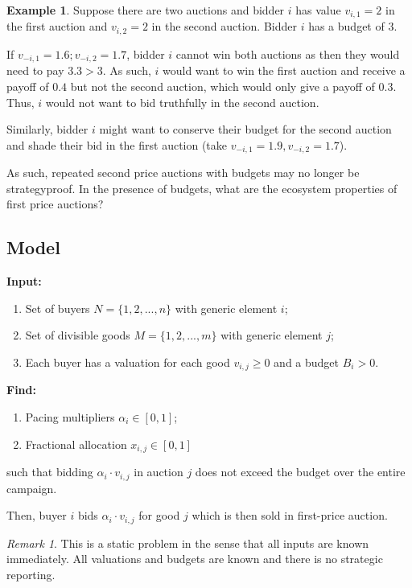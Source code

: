 \documentclass[dvipsnames]{article}
\theoremstyle{definition}
\newtheorem{example}[definition]{Example}
\theoremstyle{remark}
\newtheorem*{remark}{Remark}
\begin{document}
\begin{example}
	Suppose there are two auctions and bidder $i$ has value $v_{i,1} = 2$ in the first auction and $v_{i,2} = 2$ in the second auction. Bidder $i$ has a budget of $3$.
	
	If $v_{-i,1} = 1.6; v_{-i,2} = 1.7$, bidder $i$ cannot win both auctions as then they would need to pay $3.3>3$. As such, $i$ would want to win the first auction and receive a payoff of $0.4$ but not the second auction, which would only give a payoff of $0.3$. Thus, $i$ would not want to bid truthfully in the second auction. 
	
	Similarly, bidder $i$ might want to conserve their budget for the second auction and shade their bid in the first auction (take $v_{-i,1} = 1.9, v_{-i,2} = 1.7$).
\end{example}

As such, repeated second price auctions with budgets may no longer be strategyproof. In the presence of budgets, what are the ecosystem properties of first price auctions?

\subsection{Model}
\textbf{Input:}
\begin{enumerate}
	\item Set of buyers $N = \{1,2,...,n\}$ with generic element $i$;
	\item Set of divisible goods $M = \{1,2,...,m\}$ with generic element $j$;
	\item Each buyer has a valuation for each good $v_{i,j} \geq 0$ and a budget $B_i > 0$.
\end{enumerate}
\textbf{Find:}
\begin{enumerate}
	\item Pacing multipliers $\alpha_i \in [0,1]$;
	\item Fractional allocation $x_{i,j} \in [0,1]$
\end{enumerate}
such that bidding $\alpha_i \cdot v_{i,j}$ in auction $j$ does not exceed the budget over the entire campaign.

Then, buyer $i$ bids $\alpha_i \cdot v_{i,j}$ for good $j$ which is then sold in first-price auction.
\begin{remark}
	This is a static problem in the sense that all inputs are known immediately. All valuations and budgets are known and there is no strategic reporting. 
\end{remark}
\end{document}
